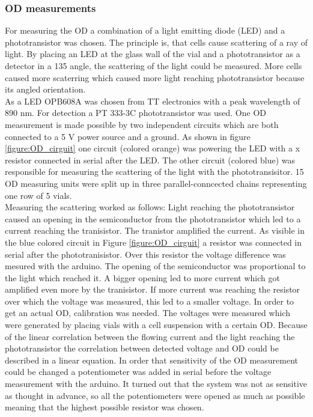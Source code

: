 \subsubsection{OD measurements}
For measuring the OD a combination of a light emitting diode (LED) and a phototransistor was chosen. The principle is, that cells cause scattering of a ray of light. By placing an LED at the glass wall of the vial and a phototransistor as a detector in a 135 \degree \space angle, the scattering of the light could be measured. More cells caused more scaterring which caused more light reaching phototransistor because its angled orientation. \\
As a LED OPB608A was chosen from TT electronics with a peak wavelength of 890 nm. For detection a PT 333-3C phototransistor was used. One OD measurement is made possible by two independent circuits which are both connected to a 5 V power source and a ground. As shown in figure \ref{figure:OD_cirguit} one circuit (colored orange) was powering the LED with a x \textOmega resistor connected in serial after the LED. The other circuit (colored blue) was responsible for measuring the scattering of the light with the phototransisitor. 15 OD measuring units were split up in three parallel-conncected chains representing one row of 5 vials. \\
Measuring the scattering worked as follows: Light reaching the phototransistor caused an opening in the semiconductor from the phototransistor which led to a current reaching the tranisistor. The tranistor amplified the current. As visible in the blue colored circuit in Figure \ref{figure:OD_cirguit} a resistor was connected in serial after the phototranisistor. Over this resistor the voltage difference was mesured with the arduino. The opening of the semiconductor was proportional to the light which reached it. A bigger opening led to more current which got amplified even more by the tranisistor. If more current was reaching the resistor over which the voltage was measured, this led to a smaller voltage. In order to get an actual OD, calibration was needed. The voltages were measured which were generated by placing vials with a cell suspension with a certain OD. Because of the linear correlation between the flowing current and the light reaching the phototransistor the correlation between detected voltage and OD could be described in a linear equation.  
In order that sensitivity of the OD measurement could be changed a potentiometer was added in serial before the voltage measurement with the arduino. It turned out that the system was not as sensitive as thought in advance, so all the potentiometers were opened as much as possible meaning that the highest possible resistor was chosen.   

